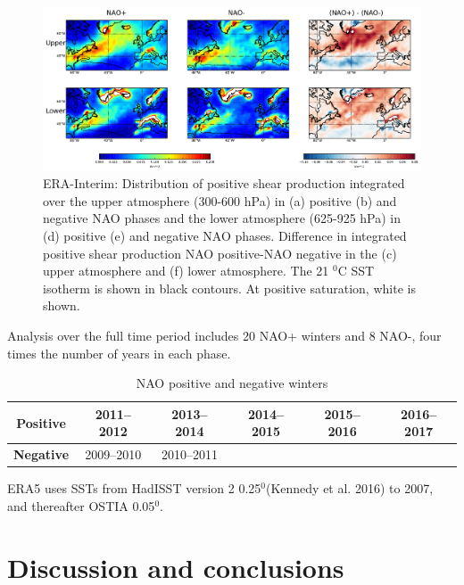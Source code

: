 \begin{figure}[h]
	\centering
	\includegraphics[width=32pc]{ERA_6shear_subplot.pdf}
	\caption{ERA-Interim: Distribution of positive shear production integrated over the upper atmosphere (300-600 hPa) in (a) positive (b) and negative NAO phases and the lower atmosphere (625-925 hPa) in (d) positive (e) and negative NAO phases. Difference in integrated positive shear production NAO positive-NAO negative in the (c) upper atmosphere and (f) lower atmosphere. The 21 $^{0}$C SST isotherm is shown in black contours. At positive saturation, white is shown.}
	\label{fig:ERA_shear}
\end{figure}


Analysis over the full time period includes 20 NAO+ winters and 8 NAO-, four times the number of years in each phase.

  \begin{table}
  \caption{NAO positive and negative winters} \label{t_NAO}
  \centering
  \begin{tabular}{c c c c c c}
  \hline
  \textbf{Positive} & 2011--2012 & 2013--2014 & 2014--2015 & 2015--2016 & 2016--2017 \\
  \hline
  \textbf{Negative}  & 2009--2010  & 2010--2011 &  &  &  \\
  \hline
  \end{tabular}
  \end{table}



ERA5 uses SSTs from HadISST version 2 0.25$^{0}$(Kennedy et al. 2016) to 2007, and thereafter OSTIA 0.05$^{0}$.


\section{Discussion and conclusions}

